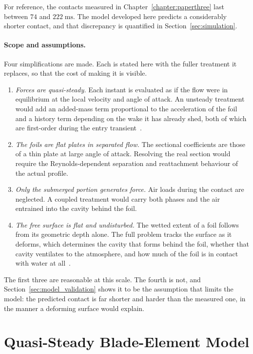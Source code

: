 For reference, the contacts measured in Chapter~\ref{chapter:paperthree} last
between $74$ and $222\;\mathrm{ms}$.  The model developed here predicts a
considerably shorter contact, and that discrepancy is quantified in
Section~\ref{sec:simulation}.

\paragraph{Scope and assumptions.}
Four simplifications are made.  Each is stated here with the fuller treatment it
replaces, so that the cost of making it is visible.

\begin{enumerate}[nosep]
  \item \emph{Forces are quasi-steady.}  Each instant is evaluated as if the
    flow were in equilibrium at the local velocity and angle of attack.  An
    unsteady treatment would add an added-mass term proportional to the
    acceleration of the foil and a history term depending on the wake it has
    already shed, both of which are first-order during the entry
    transient~\cite{truscott2014water}.
  \item \emph{The foils are flat plates in separated flow.}  The sectional
    coefficients are those of a thin plate at large angle of attack.  Resolving
    the real section would require the Reynolds-dependent separation and
    reattachment behaviour of the actual profile.
  \item \emph{Only the submerged portion generates force.}  Air loads during
    the contact are neglected.  A coupled treatment would carry both phases and
    the air entrained into the cavity behind the foil.
  \item \emph{The free surface is flat and undisturbed.}  The wetted extent of
    a foil follows from its geometric depth alone.  The full problem tracks the
    surface as it deforms, which determines the cavity that forms behind the
    foil, whether that cavity ventilates to the atmosphere, and how much of the
    foil is in contact with water at all~\cite{truscott2014water}.
\end{enumerate}

The first three are reasonable at this scale.  The fourth is not, and
Section~\ref{sec:model_validation} shows it to be the assumption that limits
the model: the predicted contact is far shorter and harder than the measured
one, in the manner a deforming surface would explain.

\section{Quasi-Steady Blade-Element Model}
\label{sec:quasi_steady}

